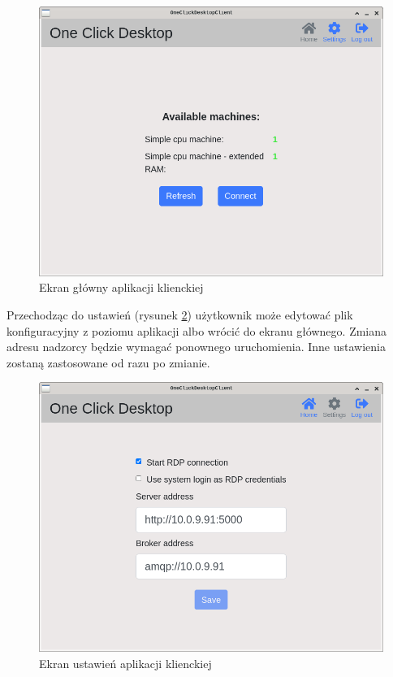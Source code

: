 \documentclass[../opis-rozwiazania.tex]{subfiles}
\begin{document}
\begin{figure}[h!]
  \centering
  \includegraphics[width=\textwidth]{resources/client_home.png}
  \caption{Ekran główny aplikacji klienckiej}
  \label{figure:system_interaction.client.home}
\end{figure}

Przechodząc do ustawień (rysunek \ref{figure:system_interaction.client.settings}) użytkownik może edytować plik konfiguracyjny z poziomu aplikacji albo wrócić do ekranu głównego.
Zmiana adresu nadzorcy będzie wymagać ponownego uruchomienia.
Inne ustawienia zostaną zastosowane od razu po zmianie.

\begin{figure}[h!]
  \centering
  \includegraphics[width=\textwidth]{resources/client_settings.png}
  \caption{Ekran ustawień aplikacji klienckiej}
  \label{figure:system_interaction.client.settings}
\end{figure}
\end{document}
